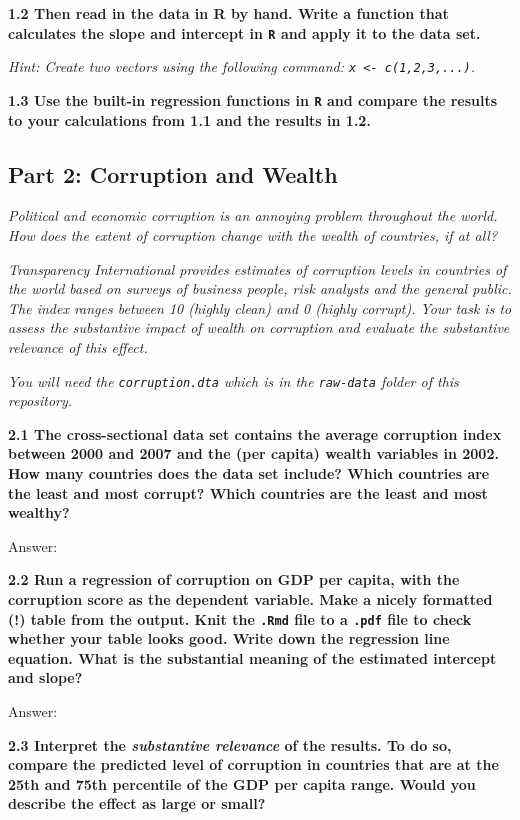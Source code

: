 \documentclass[
]{article}
\begin{document}
\textbf{1.2 Then read in the data in R by hand. Write a function that
calculates the slope and intercept in \texttt{R} and apply it to the
data set.}

\emph{Hint: Create two vectors using the following command:
\texttt{x\ \textless{}-\ c(1,2,3,...)}.}

\textbf{1.3 Use the built-in regression functions in \texttt{R} and
compare the results to your calculations from 1.1 and the results in
1.2.}

\hypertarget{part-2-corruption-and-wealth}{%
\subsection{Part 2: Corruption and
Wealth}\label{part-2-corruption-and-wealth}}

\emph{Political and economic corruption is an annoying problem
throughout the world. How does the extent of corruption change with the
wealth of countries, if at all?}

\emph{Transparency International provides estimates of corruption levels
in countries of the world based on surveys of business people, risk
analysts and the general public. The index ranges between 10 (highly
clean) and 0 (highly corrupt). Your task is to assess the substantive
impact of wealth on corruption and evaluate the substantive relevance of
this effect.}

\emph{You will need the \texttt{corruption.dta} which is in the
\texttt{raw-data} folder of this repository.}

\textbf{2.1 The cross-sectional data set contains the average corruption
index between 2000 and 2007 and the (per capita) wealth variables in
2002. How many countries does the data set include? Which countries are
the least and most corrupt? Which countries are the least and most
wealthy?}

Answer:

\textbf{2.2 Run a regression of corruption on GDP per capita, with the
corruption score as the dependent variable. Make a nicely formatted (!)
table from the output. Knit the \texttt{.Rmd} file to a \texttt{.pdf}
file to check whether your table looks good. Write down the regression
line equation. What is the substantial meaning of the estimated
intercept and slope?}

Answer:

\textbf{2.3 Interpret the \emph{substantive relevance} of the results.
To do so, compare the predicted level of corruption in countries that
are at the 25th and 75th percentile of the GDP per capita range. Would
you describe the effect as large or small?}
\end{document}
